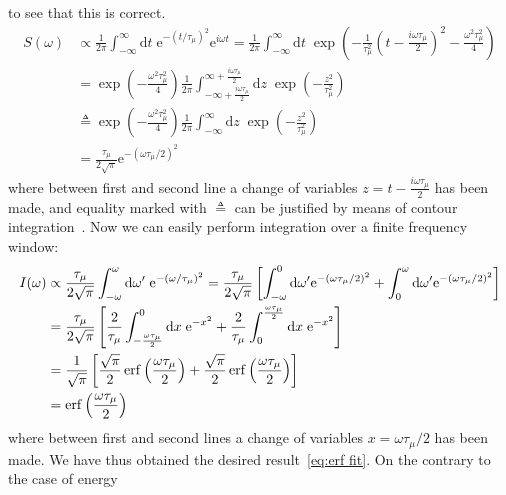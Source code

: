 to see that this is correct.
\begin{align}
  S(\omega) &\propto \frac{1}{2\pi} \int_{-\infty}^{\infty} \mathrm{d}t \; \mathrm{e}^{-(t/\tau_{\mu})^2}
  \mathrm{e}^{i\omega t} = \frac{1}{2\pi} \int_{-\infty}^{\infty} \mathrm{d}t \; 
  \exp\left(-\frac{1}{\tau_{\mu}^2} \left(t-\frac{i\omega\tau_{\mu}}{2}\right)^2 
  - \frac{\omega^2\tau_{\mu}^2}{4}\right) \nonumber \\
  &= \exp\left(- \frac{\omega^2\tau_{\mu}^2}{4}\right) \frac{1}{2\pi}
  \int_{-\infty+\frac{i\omega\tau_{\mu}}{2}}^{\infty+\frac{i\omega\tau_{\mu}}{2}} 
  \mathrm{d} z\; \exp\left(-\frac{z^2}{\tau_{\mu}^2}\right) \nonumber\\
  & \triangleq \exp\left(- \frac{\omega^2
  \tau_{\mu}^2}{4}\right) \frac{1}{2\pi} \int_{-\infty}^{\infty}
  \mathrm{d} z\; \exp\left(-\frac{z^2}{\tau_{\mu}^2}\right) \nonumber  \\
  &= \frac{\tau_{\mu}}{2\sqrt{\pi}}\mathrm{e}^{-(\omega \tau_{\mu}/2)^2}
\end{align}
where between first and second line a change of variables \(z = t-\frac{i \omega \tau_{\mu}}{2}\)
has been made, and equality marked with \(\triangleq\) can be justified by means of contour
integration~\autocite{Stein2010}. Now we can easily perform integration over a finite
frequency window:
\begin{align}
  I(\omega) &\propto \frac{\tau_{\mu}}{2\sqrt{\pi}}\int_{-\omega}^{\omega} \mathrm{d}\omega^{\prime}\;
  \mathrm{e}^{-(\omega/\tau_{\mu})^2} = \frac{\tau_{\mu}}{2\sqrt{\pi}}
  \left[\int_{-\omega}^{0} \mathrm{d}\omega^{\prime} \mathrm{e}^{-(\omega\tau_{\mu}/2)^2} + 
  \int_{0}^{\omega} \mathrm{d}\omega^{\prime} \mathrm{e}^{-(\omega\tau_{\mu}/2)^2} \right]\nonumber\\
  &= \frac{\tau_{\mu}}{2\sqrt{\pi}} \left[ \frac{2}{\tau_{\mu}}\int_{-\frac{\omega\tau_{\mu}}{2}}^{0} 
  \mathrm{d} x\;  \mathrm{e}^{-x^2} + \frac{2}{\tau_{\mu}}\int_{0}^{\frac{\omega\tau_{\mu}}{2}}
   \mathrm{d}x\; \mathrm{e}^{-x^2} \right]\nonumber\\ 
   &= \frac{1}{\sqrt{\pi}} \left[ \frac{\sqrt{\pi}}{2} \erf\left(\frac{\omega\tau_{\mu}}{2}\right) +
   \frac{\sqrt{\pi}}{2} \erf\left(\frac{\omega\tau_{\mu}}{2}\right) \right]\nonumber\\
    &= \erf\left(\frac{\omega\tau_{\mu}}{2}\right)
\end{align}
where between first and second lines a change of variables \(x=\omega\tau_{\mu}/2\) has been made.
We have thus obtained the desired result~\ref{eq:erf fit}. On the contrary to the case of energy

